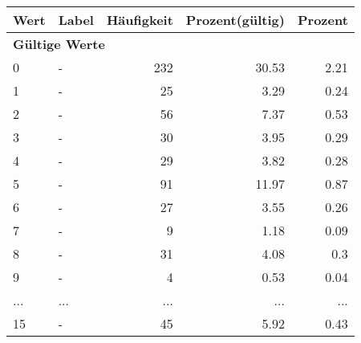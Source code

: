      \begin{longtable}{lXrrr}
     \toprule
     \textbf{Wert} & \textbf{Label} & \textbf{Häufigkeit} & \textbf{Prozent(gültig)} & \textbf{Prozent} \\
     \endhead
     \midrule
     \multicolumn{5}{l}{\textbf{Gültige Werte}}\\
        0 & \multicolumn{1}{X}{-} & %
          \num{232} &
          \num[round-mode=places,round-precision=2]{30.53} &
          \num[round-mode=places,round-precision=2]{2.21} \\
        1 & \multicolumn{1}{X}{-} & %
          \num{25} &
          \num[round-mode=places,round-precision=2]{3.29} &
          \num[round-mode=places,round-precision=2]{0.24} \\
        2 & \multicolumn{1}{X}{-} & %
          \num{56} &
          \num[round-mode=places,round-precision=2]{7.37} &
          \num[round-mode=places,round-precision=2]{0.53} \\
        3 & \multicolumn{1}{X}{-} & %
          \num{30} &
          \num[round-mode=places,round-precision=2]{3.95} &
          \num[round-mode=places,round-precision=2]{0.29} \\
        4 & \multicolumn{1}{X}{-} & %
          \num{29} &
          \num[round-mode=places,round-precision=2]{3.82} &
          \num[round-mode=places,round-precision=2]{0.28} \\
        5 & \multicolumn{1}{X}{-} & %
          \num{91} &
          \num[round-mode=places,round-precision=2]{11.97} &
          \num[round-mode=places,round-precision=2]{0.87} \\
        6 & \multicolumn{1}{X}{-} & %
          \num{27} &
          \num[round-mode=places,round-precision=2]{3.55} &
          \num[round-mode=places,round-precision=2]{0.26} \\
        7 & \multicolumn{1}{X}{-} & %
          \num{9} &
          \num[round-mode=places,round-precision=2]{1.18} &
          \num[round-mode=places,round-precision=2]{0.09} \\
        8 & \multicolumn{1}{X}{-} & %
          \num{31} &
          \num[round-mode=places,round-precision=2]{4.08} &
          \num[round-mode=places,round-precision=2]{0.3} \\
        9 & \multicolumn{1}{X}{-} & %
          \num{4} &
          \num[round-mode=places,round-precision=2]{0.53} &
          \num[round-mode=places,round-precision=2]{0.04} \\
       ... & ... & ... & ... & ... \\
        15 & \multicolumn{1}{X}{-} & %
          \num{45} &
          \num[round-mode=places,round-precision=2]{5.92} &
          \num[round-mode=places,round-precision=2]{0.43} \\


\end{longtable}
